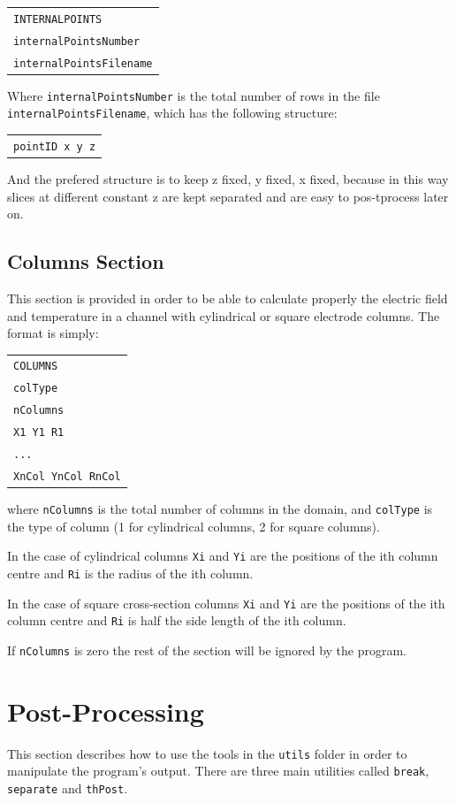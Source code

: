 \documentclass[12pt]{article}
\begin{document}
\begin{tabular}{l}
\texttt{INTERNALPOINTS}\\
\texttt{internalPointsNumber}\\
\texttt{internalPointsFilename}
\end{tabular}

Where \verb+internalPointsNumber+ is the total number of rows in the file \verb+internalPointsFilename+, which has the following structure:

\begin{tabular}{l}
\texttt{pointID x y z}
\end{tabular}

And the prefered structure is to keep z fixed, y fixed, x fixed, because in this way slices at different constant z are kept separated and are easy to pos-tprocess later on.

\subsection{Columns Section}
This section is provided in order to be able to calculate properly the electric field and temperature in a channel with cylindrical or square electrode columns. The format is simply:

\begin{tabular}{l}
\texttt{COLUMNS}\\
\texttt{colType}\\
\texttt{nColumns}\\
\texttt{X1 Y1 R1}\\
\texttt{...}\\
\texttt{XnCol YnCol RnCol}
\end{tabular}

where \verb+nColumns+ is the total number of columns in the domain, and \verb+colType+ is the type of column (1 for cylindrical columns, 2 for square columns).

In the case of cylindrical columns \verb+Xi+ and \verb+Yi+ are the positions of the ith column centre and \verb+Ri+ is the radius of the ith column.

In the case of square cross-section columns \verb+Xi+ and \verb+Yi+ are the positions of the ith column centre and \verb+Ri+ is half the side length of the ith column.

If \verb+nColumns+ is zero the rest of the section will be ignored by the program.

\pagebreak

\section{Post-Processing}
This section describes how to use the tools in the \verb+utils+ folder in order to manipulate the program's output. There are three main utilities called \verb+break+, \verb+separate+ and \verb+thPost+.
\end{document}
